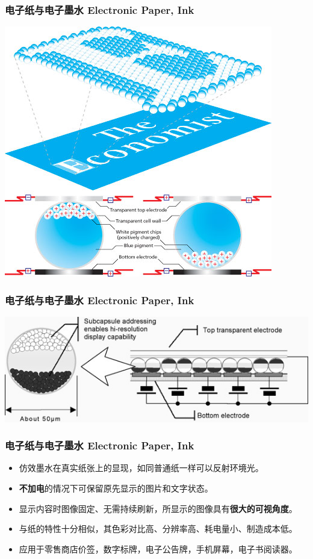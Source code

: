 \documentclass{beamer}
\begin{document}
\begin{frame}
	\frametitle{电子纸与电子墨水 Electronic Paper, Ink}
	\transwipe
	\begin{center}
	\includegraphics[height=.8\textheight, width=.6\textwidth]{images/e-ink-technology.jpg}
	\end{center}
\end{frame}

\begin{frame}
	\frametitle{电子纸与电子墨水 Electronic Paper, Ink}
	\transwipe
	\begin{center}
	\includegraphics[width=\textwidth]{images/e-ink-technology-detail.jpg}
	\end{center}
\end{frame}

\begin{frame}[transwipe]
	\frametitle{电子纸与电子墨水 Electronic Paper, Ink}
	\beamertemplatetransparentcovereddynamicmedium
	\begin{itemize}[<+->]
		\item 仿效墨水在真实纸张上的显现，如同普通纸一样可以反射环境光。
		\item \textbf{不加电}的情况下可保留原先显示的图片和文字状态。
		\item 显示内容时图像固定、无需持续刷新，所显示的图像具有\textbf{很大的可视角度}。
		\item 与纸的特性十分相似，其色彩对比高、分辨率高、耗电量小、制造成本低。
		\item 应用于零售商店价签，数字标牌，电子公告牌，手机屏幕，电子书阅读器。
	\end{itemize}
\end{frame}
\end{document}
